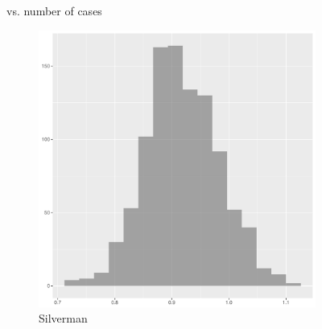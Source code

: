 \begin{figure}[htbp]
\begin{subfigure}[b]{0.24\textwidth}
    \label{fig:ise:unif_NCases_1h:nmise_log_log}
    \end{subfigure}
    \caption[: by number of cases]{ vs. number of cases}
    \label{fig:ise:unif_NCases_1h}
\end{figure}

\begin{figure}[htbp]
    \centering
    \begin{subfigure}[b]{0.3\textwidth}
    \includegraphics[width=\textwidth]{results/unif_100_1.0_1h/output/bandwidths-silverman}
    \caption{Silverman}
    \label{fig:bandwidths_x1:unif_100_1.0_1h:s}
    \end{subfigure}
    \begin{subfigure}[b]{0.3\textwidth}

\end{subfigure}
\end{figure}
